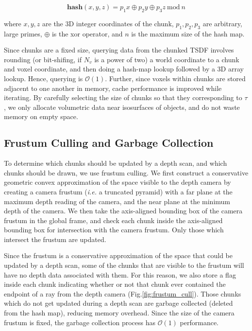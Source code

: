 \documentclass[10pt,twocolumn,letterpaper]{article}
\newcommand{\figref}[1]{Fig.\ref{#1}}
\begin{document}
\begin{equation}
\textbf{hash}(x, y, z) = p_1 x\oplus p_2 y \oplus p_3 z
~\text{mod}~n
\end{equation}

\noindent where $x, y, z$ are the 3D integer coordinates of the chunk, $p_1,
p_2, p_3$ are arbitrary, large primes, $\oplus$ is the xor operator, and $n$ is
the maximum size of the hash map.

Since chunks are a fixed size, querying data from the chunked TSDF involves
rounding (or bit-shifing, if $N_v$ is a power of two) a world coordinate to a
chunk and voxel coordinate, and then doing a hash-map lookup followed by a 3D
array lookup. Hence, querying is $\mathcal{O}(1)$. Further, since voxels within
chunks are stored adjacent to one another in memory, cache performance is
improved while iterating. By carefully selecting the size of chunks so that they
corresponding to $\tau$, we only allocate volumetric data near isosurfaces of
objects, and do not waste memory on empty space.

\subsection{Frustum Culling and Garbage Collection}
\label{section:frustum}
To determine which chunks should be updated by a depth scan, and which chunks
should be drawn, we use frustum culling. We first construct a conservative
geometric convex approximation of the space visible to the depth camera by
creating a camera frustum (\textit{i.e.} a truncated pyramid) with a far plane
at the maximum depth reading of the camera, and the near plane at the minimum
depth of the camera. We then take the axis-aligned bounding box of the camera
frustum in the global frame, and check each chunk inside the axis-aligned
bounding box for intersection with the camera frustum. Only those which
intersect the frustum are updated. 

Since the frustum is a conservative approximation of the space that could be
updated by a depth scan, some of the chunks that are visible to the frustum will
have no depth data associated with them. For this reason, we also store a flag
inside each chunk indicating whether or not that chunk ever contained the
endpoint of a ray from the depth camera (\figref{fig:frustum_cull}). Those
chunks which do not get updated during a depth scan are garbage collected
(deleted from the hash map), reducing memory overhead. Since the size of the
camera frustum is fixed, the garbage collection process has $\mathcal{O}(1)$
performance.
\end{document}
